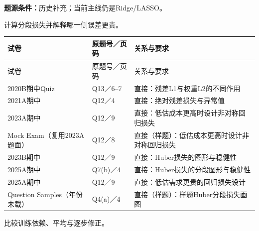 \textbf{题源条件：}历史补充；当前主线仍是Ridge/LASSO。



计算分段损失并解释哪一侧误差更贵。

\begingroup\small\setlength{\tabcolsep}{3pt}\renewcommand{\arraystretch}{1.22}
\begin{longtable}{@{}>{\raggedright\arraybackslash}p{}>{\raggedright\arraybackslash}p{}>{\raggedright\arraybackslash}p{}@{}}
\toprule
试卷 & 原题号／页码 & 关系与要求 \\
\midrule\endfirsthead
试卷 & 原题号／页码 & 关系与要求 \\
\midrule\endhead
\bottomrule\endfoot
2020B期中Quiz & Q13／6–7 & 直接：残差L1与权重L2的不同作用 \\
2021A期中 & Q12／4 & 直接：绝对残差损失与异常值 \\
2023A期中 & Q12／9 & 直接：低估成本更高时设计非对称回归损失 \\
Mock Exam（复用2023A题面） & Q12／8 & 直接（样题）：低估成本更高时设计非对称回归损失 \\
2023B期中 & Q12／9 & 直接：Huber损失的图形与稳健性 \\
2025A期中 & Q7(b)／4 & 直接：Huber损失的分段图形与稳健性 \\
2025A期中 & Q12／9 & 直接：低估需求更贵的回归损失设计 \\
Question Samples（年份未载） & Q4(a)／4 & 直接（样题）：样题Huber分段损失画图 \\
\end{longtable}\endgroup



比较训练依赖、平均与逐步修正。

